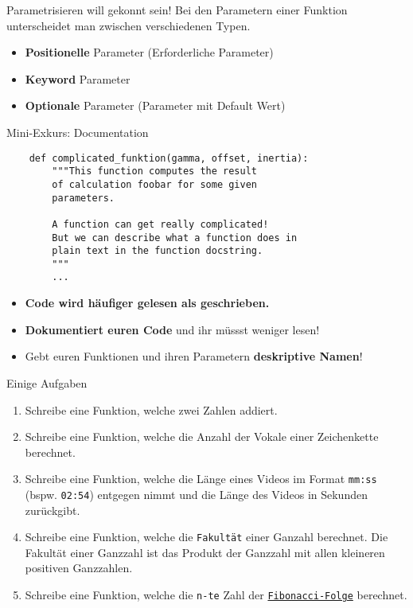 \begin{frame}[fragile]{Parametrisieren will gekonnt sein!}
Bei den Parametern einer Funktion unterscheidet man zwischen verschiedenen Typen.
\begin{itemize}
    \item \textbf{Positionelle} Parameter (Erforderliche Parameter)
    \item \textbf{Keyword} Parameter
    \item \textbf{Optionale} Parameter (Parameter mit Default Wert)
\end{itemize}
\end{frame}

\begin{frame}[fragile]{Mini-Exkurs: Documentation}
    \begin{lstlisting}
    def complicated_funktion(gamma, offset, inertia):
        """This function computes the result
        of calculation foobar for some given
        parameters.

        A function can get really complicated!
        But we can describe what a function does in
        plain text in the function docstring.
        """
        ...
    \end{lstlisting}
    \begin{itemize}
        \item \textbf{\alert{Code wird häufiger gelesen als geschrieben.}}
        \item \textbf{Dokumentiert euren Code} und ihr müssst weniger lesen!
        \item Gebt euren Funktionen und ihren Parametern \textbf{deskriptive Namen}!
    \end{itemize}
\end{frame}

\begin{frame}{Einige Aufgaben}
    \begin{enumerate}
    	\item Schreibe eine Funktion, welche zwei Zahlen addiert.
        \item Schreibe eine Funktion, welche die Anzahl der Vokale einer Zeichenkette berechnet.
        \item Schreibe eine Funktion, welche die Länge eines Videos im Format \texttt{mm:ss} (bspw. \texttt{02:54}) entgegen nimmt und die Länge des Videos in Sekunden zurückgibt.
        \item Schreibe eine Funktion, welche die \texttt{Fakultät} einer Ganzahl berechnet. Die Fakultät einer Ganzzahl ist das Produkt der Ganzzahl mit allen kleineren positiven Ganzzahlen.
        \item Schreibe eine Funktion, welche die \texttt{n-te} Zahl der \href{https://de.wikipedia.org/wiki/Fibonacci-Folge}{\texttt{Fibonacci-Folge}} berechnet.
    \end{enumerate}
\end{frame}

